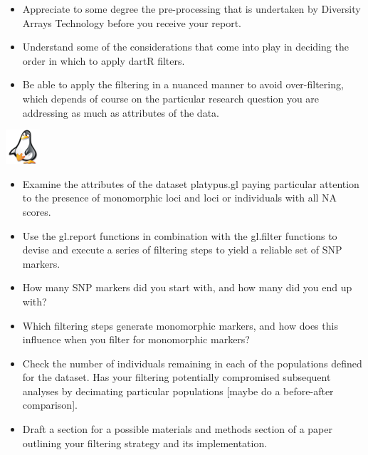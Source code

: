 \documentclass[
  letterpaper,
  DIV=11,
  numbers=noendperiod]{scrreprt}
\providecommand{\tightlist}{%
  \setlength{\itemsep}{0pt}\setlength{\parskip}{0pt}}\usepackage{longtable,booktabs,array}
\begin{document}
\begin{itemize}
\tightlist
\item
  Appreciate to some degree the pre-processing that is undertaken by
  Diversity Arrays Technology before you receive your report.
\item
  Understand some of the considerations that come into play in deciding
  the order in which to apply dartR filters.
\item
  Be able to apply the filtering in a nuanced manner to avoid
  over-filtering, which depends of course on the particular research
  question you are addressing as much as attributes of the data.
\end{itemize}

\begin{tcolorbox}[enhanced jigsaw, toptitle=1mm, colframe=quarto-callout-note-color-frame, title=\textcolor{quarto-callout-note-color}{\faInfo}\hspace{0.5em}{Exercise 1: Filtering the Platypus dataset}, breakable, arc=.35mm, bottomrule=.15mm, bottomtitle=1mm, opacitybacktitle=0.6, titlerule=0mm, rightrule=.15mm, toprule=.15mm, leftrule=.75mm, coltitle=black, left=2mm, opacityback=0, colback=white, colbacktitle=quarto-callout-note-color!10!white]

\includegraphics[width=0.5in,height=0.5in]{images/task.png}

\begin{itemize}
\tightlist
\item
  Examine the attributes of the dataset platypus.gl paying particular
  attention to the presence of monomorphic loci and loci or individuals
  with all NA scores.
\item
  Use the gl.report functions in combination with the gl.filter
  functions to devise and execute a series of filtering steps to yield a
  reliable set of SNP markers.
\item
  How many SNP markers did you start with, and how many did you end up
  with?
\item
  Which filtering steps generate monomorphic markers, and how does this
  influence when you filter for monomorphic markers?
\item
  Check the number of individuals remaining in each of the populations
  defined for the dataset. Has your filtering potentially compromised
  subsequent analyses by decimating particular populations {[}maybe do a
  before-after comparison{]}.
\item
  Draft a section for a possible materials and methods section of a
  paper outlining your filtering strategy and its implementation.
\end{itemize}

\end{tcolorbox}
\end{document}
